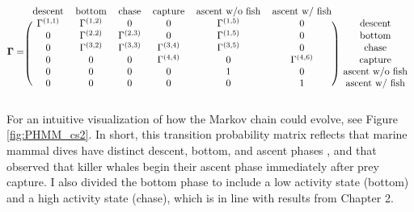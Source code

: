 \begin{equation}
    \bfGamma = 
    \begin{blockarray}{ccccccc}
        \text{descent} & \text{bottom} & \text{chase} & \text{capture} & \text{ascent w/o fish} & \text{ascent w/ fish} \\
        \begin{block}{(cccccc)c}
            \Gamma^{(1,1)} & \Gamma^{(1,2)} & 0 & 0 & \Gamma^{(1,5)} & 0 & \text{descent} \\
            0 & \Gamma^{(2,2)} & \Gamma^{(2,3)} & 0 & \Gamma^{(1,5)} & 0 & \text{bottom} \\
            0 & \Gamma^{(3,2)} & \Gamma^{(3,3)} & \Gamma^{(3,4)} & \Gamma^{(3,5)} & 0 & \text{chase} \\
            0 & 0 & 0 & \Gamma^{(4,4)} & 0 & \Gamma^{(4,6)} & \text{capture} \\
            0 & 0 & 0 & 0 & 1 & 0 & \text{ascent w/o fish} \\
            0 & 0 & 0 & 0 & 0 & 1 & \text{ascent w/ fish} \\
        \end{block}
    \end{blockarray}
    \label{eqn:Gamma_cs2}
\end{equation}

For an intuitive visualization of how the Markov chain could evolve, see Figure \ref{fig:PHMM_cs2}. In short, this transition probability matrix reflects that marine mammal dives have distinct descent, bottom, and ascent phases \citep{Tennessen:2019a}, and that \citet{Wright:2017} observed that killer whales begin their ascent phase immediately after prey capture. I also divided the bottom phase to include a low activity state (bottom) and a high activity state (chase), which is in line with results from Chapter 2. %

